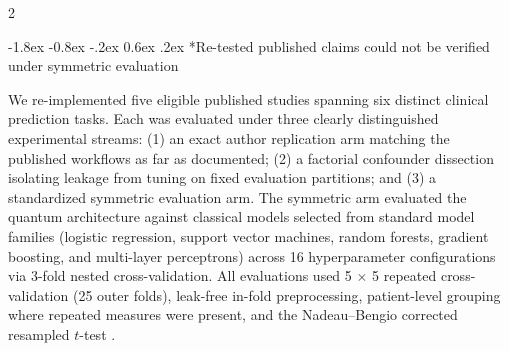 \documentclass[10pt,a4paper,twoside]{article}
\makeatletter
\renewcommand{\subsection}{\@startsection{subsection}{2}{\z@}%
  {-1.8ex \@plus -0.8ex \@minus -.2ex}%
  {0.6ex \@plus.2ex}%
  {\normalfont\normalsize\sffamily\bfseries\color{naturedark}}}
\makeatother
\begin{document}
\begin{multicols}{2}

\subsection*{Re-tested published claims could not be verified under symmetric evaluation}

We re-implemented five eligible published studies spanning six distinct clinical prediction tasks. Each was evaluated under three clearly distinguished experimental streams: (1) an exact author replication arm matching the published workflows as far as documented; (2) a factorial confounder dissection isolating leakage from tuning on fixed evaluation partitions; and (3) a standardized symmetric evaluation arm. The symmetric arm evaluated the quantum architecture against classical models selected from standard model families (logistic regression, support vector machines, random forests, gradient boosting, and multi-layer perceptrons) across 16 hyperparameter configurations via 3-fold nested cross-validation. All evaluations used 5 $\times$ 5 repeated cross-validation (25 outer folds), leak-free in-fold preprocessing, patient-level grouping where repeated measures were present, and the Nadeau--Bengio corrected resampled $t$-test \cite{nadeau2003}.


\end{multicols}
\end{document}
